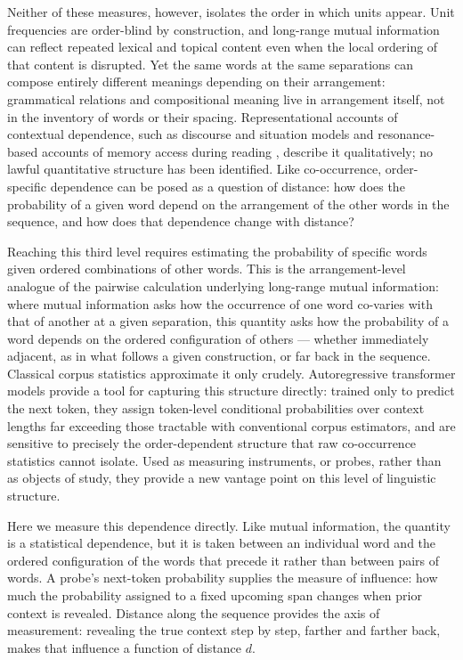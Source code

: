 \documentclass[11pt]{article}
\begin{document}
Neither of these measures, however, isolates the order in which units appear. Unit frequencies
are order-blind by construction, and long-range mutual information can reflect repeated lexical
and topical content even when the local ordering of that content is
disrupted. Yet the same words at the same separations can compose entirely different meanings
depending on their arrangement: grammatical relations and compositional meaning live in
arrangement itself, not in the inventory of words or their spacing. Representational accounts of
contextual dependence, such as discourse and situation models \citep{vandijk1983strategies} and
resonance-based accounts of memory access during reading \citep{myers1998accessing}, describe it
qualitatively; no lawful quantitative structure has been identified. Like co-occurrence,
order-specific dependence can be posed as a question of distance: how does the probability of a
given word depend on the arrangement of the other words in the sequence, and how does that
dependence change with distance?

Reaching this third level requires estimating the probability of specific words given ordered
combinations of other words. This is the arrangement-level analogue of the pairwise calculation
underlying long-range mutual information: where mutual information asks how the occurrence of one
word co-varies with that of another at a given separation, this quantity asks how the probability
of a word depends on the ordered configuration of others --- whether immediately adjacent, as in
what follows a given construction, or far back in the sequence. Classical corpus statistics
approximate it only crudely. Autoregressive transformer models
\citep{vaswani2017attention, radford2019language} provide a tool for capturing this structure
directly: trained only to predict the next token, they assign token-level conditional
probabilities over context lengths far exceeding those tractable with conventional corpus
estimators, and are sensitive to precisely the order-dependent structure that raw co-occurrence
statistics cannot isolate. Used as measuring instruments, or probes, rather than as objects of study, they provide a
new vantage point on this level of linguistic structure.

Here we measure this dependence directly. Like mutual information, the quantity is a statistical
dependence, but it is taken between an individual word and the ordered configuration of the words
that precede it rather than between pairs of words. A probe's next-token probability supplies the
measure of influence: how much the probability assigned to a fixed upcoming span changes when prior
context is revealed. Distance along the sequence provides the axis of measurement: revealing the true
context step by step, farther and farther back, makes that influence a function of distance $d$.
\end{document}
